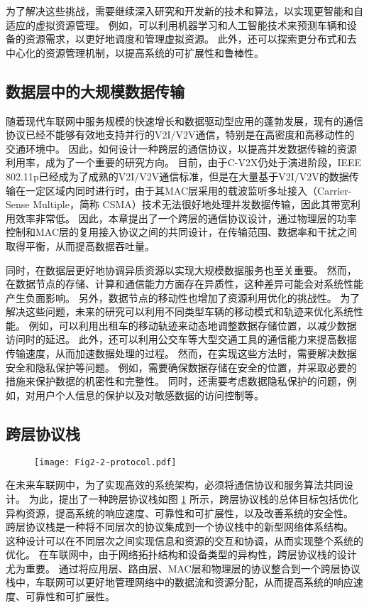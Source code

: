 为了解决这些挑战，需要继续深入研究和开发新的技术和算法，以实现更智能和自适应的虚拟资源管理。
例如，可以利用机器学习和人工智能技术来预测车辆和设备的资源需求，以更好地调度和管理虚拟资源。
此外，还可以探索更分布式和去中心化的资源管理机制，以提高系统的可扩展性和鲁棒性。

\subsection{数据层中的大规模数据传输}

随着现代车联网中服务规模的快速增长和数据驱动型应用的蓬勃发展，现有的通信协议已经不能够有效地支持并行的V2I/V2V通信，特别是在高密度和高移动性的交通环境中。
因此，如何设计一种跨层的通信协议，以提高并发数据传输的资源利用率，成为了一个重要的研究方向。
目前，由于C-V2X仍处于演进阶段，IEEE 802.11p已经成为了成熟的V2I/V2V通信标准，但是在大量基于V2I/V2V的数据传输在一定区域内同时进行时，由于其MAC层采用的载波监听多址接入（Carrier-Sense Multiple，简称 CSMA）技术无法很好地处理并发数据传输，因此其带宽利用效率非常低。
因此，本章提出了一个跨层的通信协议设计，通过物理层的功率控制和MAC层的复用接入协议之间的共同设计，在传输范围、数据率和干扰之间取得平衡，从而提高数据吞吐量。

同时，在数据层更好地协调异质资源以实现大规模数据服务也至关重要。
然而，在数据节点的存储、计算和通信能力方面存在异质性，这种差异可能会对系统性能产生负面影响。
另外，数据节点的移动性也增加了资源利用优化的挑战性。
为了解决这些问题，未来的研究可以利用不同类型车辆的移动模式和轨迹来优化系统性能。
例如，可以利用出租车的移动轨迹来动态地调整数据存储位置，以减少数据访问时的延迟。
此外，还可以利用公交车等大型交通工具的通信能力来提高数据传输速度，从而加速数据处理的过程。
然而，在实现这些方法时，需要解决数据安全和隐私保护等问题。
例如，需要确保数据存储在安全的位置，并采取必要的措施来保护数据的机密性和完整性。
同时，还需要考虑数据隐私保护的问题，例如，对用户个人信息的保护以及对敏感数据的访问控制等。

\subsection{跨层协议栈}

\begin{figure}[h] 
	\centering
	\texttt{[image: Fig2-2-protocol.pdf]}
	\label{fig 2-2}
\end{figure}


在未来车联网中，为了实现高效的系统架构，必须将通信协议和服务算法共同设计。
为此，提出了一种跨层协议栈如图 \ref{fig 2-2} 所示，跨层协议栈的总体目标包括优化异构资源，提高系统的响应速度、可靠性和可扩展性，以及改善系统的安全性。
跨层协议栈是一种将不同层次的协议集成到一个协议栈中的新型网络体系结构。
这种设计可以在不同层次之间实现信息和资源的交互和协调，从而实现整个系统的优化。
在车联网中，由于网络拓扑结构和设备类型的异构性，跨层协议栈的设计尤为重要。
通过将应用层、路由层、MAC层和物理层的协议整合到一个跨层协议栈中，车联网可以更好地管理网络中的数据流和资源分配，从而提高系统的响应速度、可靠性和可扩展性。

